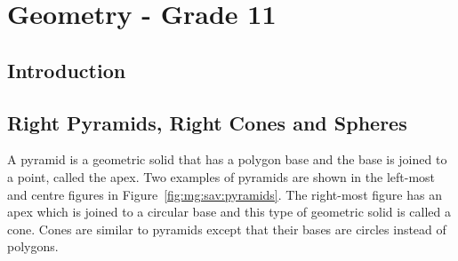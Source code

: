 \chapter{Geometry - Grade 11}
\label{m:g11}

\section{Introduction}



\section{Right Pyramids, Right Cones and Spheres}

A pyramid is a geometric solid that has a polygon base and the base is joined to a point, called the apex. Two examples of pyramids are shown in the left-most and centre figures in Figure~\ref{fig:mg:sav:pyramids}. The right-most figure has an apex which is joined to a circular base and this type of geometric solid is called a cone. Cones are similar to pyramids except that their bases are circles instead of polygons.

